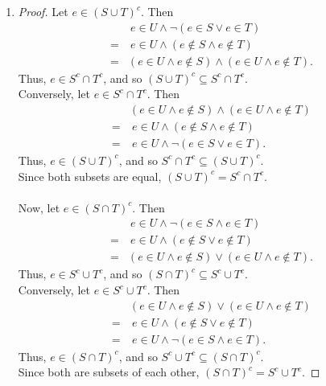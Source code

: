 \documentclass{homework}
\begin{document}
\begin{solution}
\begin{enumerate}[label=(\alph*)]
  \item 
    \begin{proof}[Proof]
        Let $e\in \left( S\cup T \right) ^{c}$. Then 
        \begin{align*}
          &~e\in U\land \neg \left( e \in S\lor e\in T\right) \\
          = &~e\in U\land \left( e\not\in S\land  e\not\in T \right) \\
          = &\left( e\in U\land e\not\in S\right) \land \left( e\in U\land e\not\in T \right) 
        .\end{align*}
        Thus, $e\in S^{c}\cap T^{c}$, and so $\left( S\cup T \right) ^{c}\subseteq S^{c}\cap T^{c}$.\\
        Conversely, let $e\in S^{c}\cap T^{c}$. Then
        \begin{align*}
          &\left( e\in U\land e\not\in S \right) \land \left(  e\in U\land e\not\in T \right)\\
          =&~e\in U\land \left( e\not\in S\land e\not\in T \right) \\
          =&~e\in U\land \neg \left(  e\in S\lor e\in T\right) 
        .\end{align*}
      Thus, $e\in \left( S\cup T \right) ^{c}$, and so $S^{c}\cap T^{c}\subseteq \left( S\cup T 
      \right) ^{c}$.\\
      Since both subsets are equal, $\left( S\cup T \right) ^{c}=S^{c}\cap T^{c}$. \\ \\
      Now, let $e\in \left( S\cap T \right) ^{c}$. Then 
      \begin{align*}
        &~e\in U\land \neg \left( e\in S\land e\in T \right) \\
        =&~e\in U\land \left( e\not\in S\lor e\not\in T \right) \\
        =&\left( e\in U\land e\not\in S \right) \lor \left( e\in U\land e\not\in T \right) 
      .\end{align*}
      Thus, $e\in S^{c}\cup T^{c}$, and so $\left( S\cap T\right) ^{c} \subseteq S^{c}\cup T^{c}$.\\
      Conversely, let $e\in S^{c}\cup T^{c}$. Then 
      \begin{align*}
        &\left( e\in U\land e\not\in S \right) \lor \left( e\in U\land e\not\in T \right)\\
        =&~e\in U \land \left( e\not\in S\lor e\not\in T \right) \\
        =&~e\in U\land \neg \left( e\in S\land e\in T \right)
      .\end{align*}
      Thus, $e\in \left( S\cap T \right) ^{c}$, and so $S^{c}\cup T^{c}\subseteq \left( S\cap 
      T \right) ^{c}$.\\
      Since both are subsets of each other, $\left( S\cap T \right) ^{c}=S^{c}\cup T^{c}$.
    \end{proof}



\end{enumerate}
\end{solution}
\end{document}

